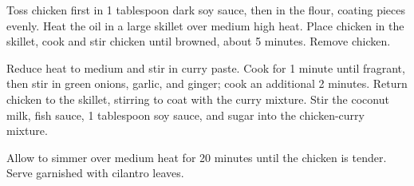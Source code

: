 
Toss chicken first in 1 tablespoon dark soy sauce, then in the flour, coating pieces evenly. Heat the oil in a large skillet over medium high heat. Place chicken in the skillet, cook and stir chicken until browned, about 5 minutes. Remove chicken.

Reduce heat to medium and stir in curry paste. Cook for 1 minute until fragrant, then stir in green onions, garlic, and ginger; cook an additional 2 minutes. Return chicken to the skillet, stirring to coat with the curry mixture. Stir the coconut milk, fish sauce, 1 tablespoon soy sauce, and sugar into the chicken-curry mixture. 

Allow to simmer over medium heat for 20 minutes until the chicken is tender. Serve garnished with cilantro leaves.
